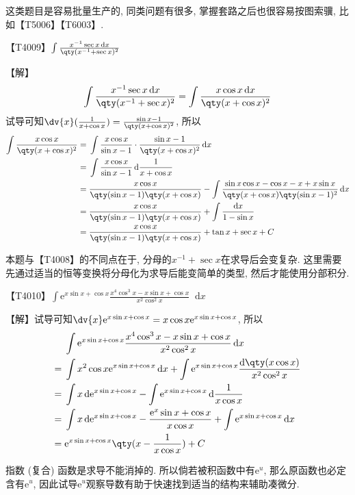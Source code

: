 \documentclass{ctexbook}
\newcommand{\e}{\mathrm{e}}
\newcommand*{\dif}{\mathop{}\!\mathrm{d}}
\begin{document}
{{这类题目是容易批量生产的, 同类问题有很多, 掌握套路之后也很容易按图索骥, 比如【T5006】【T6003】. \par}
【T4009】$\int\frac{x^{-1}\sec{x}\dif{x}}{\qty(x^{-1}+\sec{x})^{2}}$\par
【解】
\begin{align*}
\int\frac{x^{-1}\sec{x}\dif{x}}{\qty(x^{-1}+\sec{x})^{2}}=\int\frac{x\cos{x}\dif{x}}{\qty(x+\cos{x})^{2}}
\end{align*}
试导可知$\dv{x}(\frac{1}{x+\cos{x}})=\frac{\sin{x}-1}{\qty(x+\cos{x})^{2}}$, 所以
\begin{align*}
\int\frac{x\cos{x}}{\qty(x+\cos{x})^{2}}={}&\int\frac{x\cos{x}}{\sin{x}-1}\cdot\frac{\sin{x}-1}{\qty(x+\cos{x})^{2}}\dif{x}\\
={}&\int\frac{x\cos{x}}{\sin{x}-1}\dif{\frac{1}{x+\cos{x}}}\\
={}&\frac{x\cos{x}}{\qty(\sin{x}-1)\qty(x+\cos{x})}-\int\frac{\sin{x}\cos{x}-\cos{x}-x+x\sin{x}}{\qty(x+\cos{x})\qty(\sin{x}-1)^{2}}\dif{x}\\
={}&\frac{x\cos{x}}{\qty(\sin{x}-1)\qty(x+\cos{x})}+\int\frac{\dif{x}}{1-\sin{x}}\\
={}&\frac{x\cos{x}}{\qty(\sin{x}-1)\qty(x+\cos{x})}+\tan{x}+\sec{x}+C
\end{align*}\par
{\kaishu 本题与【T4008】的不同点在于, 分母的$x^{-1}+\sec{x}$在求导后会变复杂. 这里需要先通过适当的恒等变换将分母化为求导后能变简单的类型, 然后才能使用分部积分. \par}
【T4010】$\int\e^{x\sin{x}+\cos{x}}\frac{x^{4}\cos^{3}{x}-x\sin{x}+\cos{x}}{x^{2}\cos^{2}{x}}\dif{x}$\par
【解】试导可知$\dv{x}\e^{x\sin{x}+\cos{x}}=x\cos{x}\e^{x\sin{x}+\cos{x}}$, 所以
\begin{align*}
{}&\int\e^{x\sin{x}+\cos{x}}\frac{x^{4}\cos^{3}{x}-x\sin{x}+\cos{x}}{x^{2}\cos^{2}{x}}\dif{x}\\
={}&\int x^{2}\cos{x}\e^{x\sin{x}+\cos{x}}\dif{x}+\int\e^{x\sin{x}+\cos{x}}\frac{\dif{\qty(x\cos{x})}}{x^{2}\cos^{2}{x}}\\
={}&\int x\dif{\e^{x\sin{x}+\cos{x}}}-\int\e^{x\sin{x}+\cos{x}}\dif{\frac{1}{x\cos{x}}}\\
={}&\int x\dif{\e^{x\sin{x}+\cos{x}}}-\frac{\e^{x}\sin{x}+\cos{x}}{x\cos{x}}+\int\e^{x\sin{x}+\cos{x}}\dif{x}\\
={}&\e^{x\sin{x}+\cos{x}}\qty(x-\frac{1}{x\cos{x}})+C
\end{align*}\par
{\kaishu 指数 (复合) 函数是求导不能消掉的. 所以倘若被积函数中有$\e^{u}$, 那么原函数也必定含有$\e^{u}$, 因此试导$\e^{u}$观察导数有助于快速找到适当的结构来辅助凑微分. \par}
}
\end{document}
